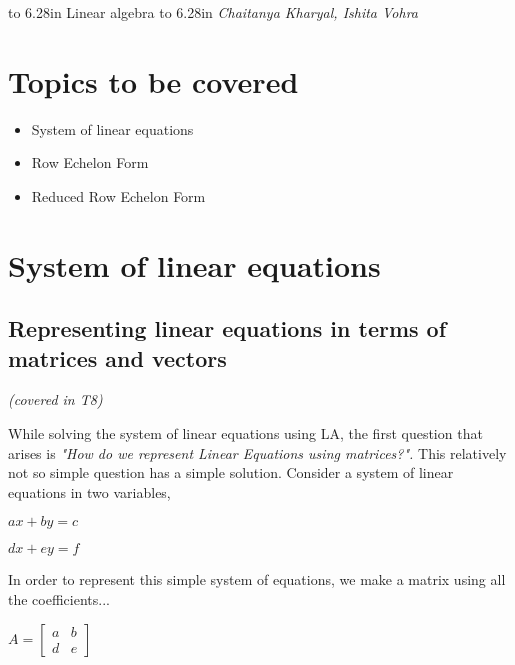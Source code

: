 \documentclass[a4paper]{article}
\begin{document}
\pagestyle{myheadings}
   \thispagestyle{plain}
   \newpage
   \noindent
   \begin{center}
   \framebox
   {
      \vbox{\vspace{2mm}
        \hbox to 6.28in { {\Large \hfill Linear algebra \hfill} } %
        \vspace{2mm}
        \hbox to 6.28in { {\it Chaitanya Kharyal, Ishita Vohra\hfill} } %
        \vspace{2mm}}
   }
   \end{center}
   \markboth{}{} %

\section{Topics to be covered}
\begin{itemize}
    \item System of linear equations
    \item Row Echelon Form
    \item Reduced Row Echelon Form
\end{itemize}

\section{System of linear equations}
\subsection{Representing linear equations in terms of matrices and vectors}
\textit{(covered in T8)}

While solving the system of linear equations using LA, the first question that arises is \textit{"How do we represent Linear Equations using matrices?".} This relatively not so simple question has a simple solution. Consider a system of linear equations in two variables,
\begin{center}
    $ax + by = c$
    
    $dx + ey = f$
\end{center}

In order to represent this simple system of equations, we make a matrix using all the coefficients...
\begin{center}
    $A = \begin{bmatrix}
        a & b \\
        d & e 
    \end{bmatrix}$
\end{center}
\end{document}
